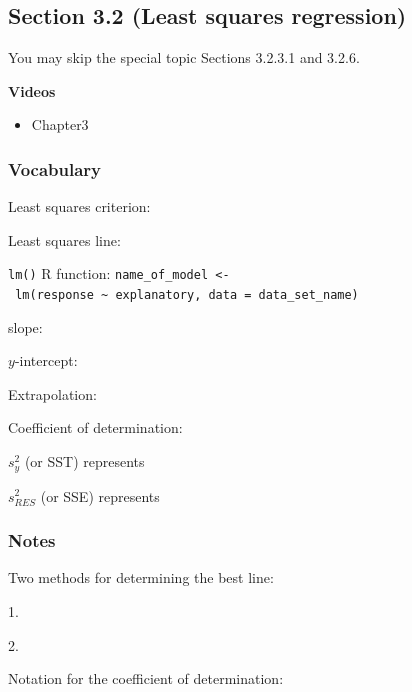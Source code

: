 \documentclass[
]{report}
\providecommand{\tightlist}{%
  \setlength{\itemsep}{0pt}\setlength{\parskip}{0pt}}
\newcommand{\rgs}{\vspace{12pt}} %
\newcommand{\rgi}{\hspace{24pt}}  %
\begin{document}
\hypertarget{section-3.2-least-squares-regression}{%
\subsection*{Section 3.2 (Least squares regression)}\label{section-3.2-least-squares-regression}}


You may skip the special topic Sections 3.2.3.1 and 3.2.6.

\textbf{Videos}

\begin{itemize}
\tightlist
\item
  Chapter3
\end{itemize}


\hypertarget{vocabulary-6}{%
\subsubsection*{Vocabulary}\label{vocabulary-6}}

Least squares criterion:
\rgs

Least squares line:
\rgs

\texttt{lm()} R function:
\rgi \texttt{name\_of\_model\ \textless{}-\ lm(response\ \textasciitilde{}\ explanatory,\ data\ =\ data\_set\_name)}

\rgs

slope:
\rgs

\(y\)-intercept:\\
\rgs

Extrapolation:
\rgs 

Coefficient of determination:

\rgi \(s_y^2\) (or SST) represents
\rgs

\rgi \(s_{RES}^2\) (or SSE) represents
\rgs

\hypertarget{notes-8}{%
\subsubsection*{Notes}\label{notes-8}}

Two methods for determining the best line:

\rgi 1.
\rgs

\rgi 2.
\rgs

Notation for the coefficient of determination:
\rgs
\end{document}
